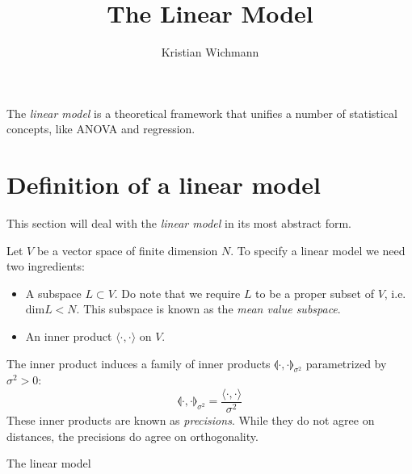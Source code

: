 \documentclass[12pt, a4paper]{article}
\title{The Linear Model}
\author{Kristian Wichmann}
\begin{document}
\maketitle

The \textit{linear model} is a theoretical framework that unifies a number of statistical concepts, like ANOVA and regression.

\section{Definition of a linear model}
This section will deal with the \textit{linear model} in its most abstract form.

Let $V$ be a vector space of finite dimension $N$. To specify a linear model we need two ingredients:
\begin{itemize}
\item A subspace $L\subset V$. Do note that we require $L$ to be a proper subset of $V$, i.e. $\textrm{dim}L<N$. This subspace is known as the \textit{mean value subspace}.
\item An inner product $\langle\cdot,\cdot\rangle$ on $V$.
\end{itemize}
The inner product induces a family of inner products $\llangle\cdot,\cdot\rrangle_{\sigma^2}$ parametrized by $\sigma^2>0$:
\begin{equation}
\llangle\cdot,\cdot\rrangle_{\sigma^2}=\frac{\langle\cdot,\cdot\rangle}{\sigma^2}
\end{equation}
These inner products are known as \textit{precisions}. While they do not agree on distances, the precisions do agree on orthogonality.

The linear model
\end{document}
